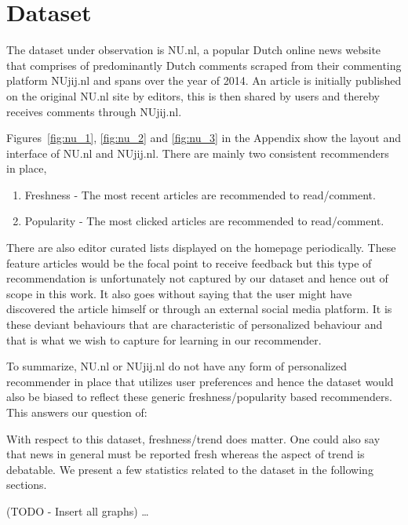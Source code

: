 \chapter{Dataset}
\label{chap:data}
The dataset under observation is NU.nl, a popular Dutch online news website that comprises of predominantly Dutch comments scraped from their commenting platform NUjij.nl and spans over the year of 2014. An article is initially published on the original NU.nl site by editors, this is then shared by users and thereby receives comments through NUjij.nl.

Figures~\ref{fig:nu_1}, \ref{fig:nu_2} and \ref{fig:nu_3} in the Appendix show the layout and interface of NU.nl and NUjij.nl. There are mainly two consistent recommenders in place,

\begin{enumerate}
\item Freshness - The most recent articles are recommended to read/comment.
\item Popularity - The most clicked articles are recommended to read/comment.
\end{enumerate}

There are also editor curated lists displayed on the homepage periodically. These feature articles would be the focal point to receive feedback but this type of recommendation is unfortunately not captured by our dataset and hence out of scope in this work. It also goes without saying that the user might have discovered the article himself or through an external social media platform. It is these deviant behaviours that are characteristic of personalized behaviour and that is what we wish to capture for learning in our recommender.

To summarize, NU.nl or NUjij.nl do not have any form of personalized recommender in place that utilizes user preferences and hence the dataset would also be biased to reflect these generic freshness/popularity based recommenders. This answers our question of:

\begin{center}
\end{center}

With respect to this dataset, freshness/trend does matter. One could also say that news in general must be reported fresh whereas the aspect of trend is debatable. We present a few statistics related to the dataset in the following sections.

(TODO - Insert all graphs) \ldots
